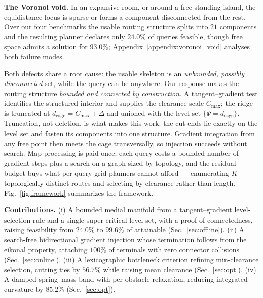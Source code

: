\documentclass[conference]{IEEEtran}
\begin{document}
\textbf{The Voronoi void.} In an expansive room, or around a free-standing island, the equidistance locus is sparse or forms a component disconnected from the rest. Over our four benchmarks the usable routing structure splits into $21$ components and the resulting planner declares only $24.0\%$ of queries feasible, though free space admits a solution for $93.0\%$; Appendix~\ref{appendix:voronoi_void} analyses both failure modes.

Both defects share a root cause: the usable skeleton is an \emph{unbounded, possibly disconnected} set, while the query can be anywhere. Our response makes the routing structure \emph{bounded and connected by construction}. A tangent--gradient test identifies the structured interior and supplies the clearance scale $C_{\max}$; the ridge is truncated at $d_{\mathrm{cage}}=C_{\max}+\Delta$ and unioned with the level set $\{\Psi=d_{\mathrm{cage}}\}$. Truncation, not deletion, is what makes this work: the cut ends lie exactly on the level set and fasten its components into one structure. Gradient integration from any free point then meets the cage transversally, so injection succeeds without search. Map processing is paid once; each query costs a bounded number of gradient steps plus a search on a graph sized by topology, and the residual budget buys what per-query grid planners cannot afford --- enumerating $K$ topologically distinct routes and selecting by clearance rather than length. Fig.~\ref{fig:framework} summarizes the framework.

\textbf{Contributions.} (i) A bounded medial manifold from a tangent--gradient level-selection rule and a single super-critical level set, with a proof of connectedness, raising feasibility from $24.0\%$ to $99.6\%$ of attainable (Sec.~\ref{sec:offline}). (ii) A search-free bidirectional gradient injection whose termination follows from the eikonal property, attaching $100\%$ of terminals with zero connector collisions (Sec.~\ref{sec:online}). (iii) A lexicographic bottleneck criterion refining min-clearance selection, cutting ties by $56.7\%$ while raising mean clearance (Sec.~\ref{sec:opt}). (iv) A damped spring--mass band with per-obstacle relaxation, reducing integrated curvature by $85.2\%$ (Sec.~\ref{sec:opt}).
\end{document}
